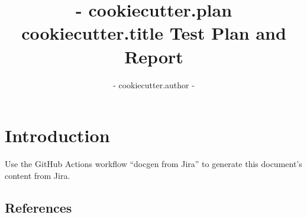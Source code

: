 \documentclass[DM,lsstdraft,toc]{lsstdoc}
\begin{document}
\def\milestoneName{ {{- cookiecutter.title -}} }
\def\milestoneId{ {{- cookiecutter.plan -}} }
\def\product{Data Management}


\title{ {{- cookiecutter.plan }} {{ cookiecutter.title }} Test Plan and Report}
\setDocRef{\lsstDocType-\lsstDocNum}
\date{\vcsDate}
\author{ {{- cookiecutter.author -}} }




\maketitle

\section{Introduction}
Use the GitHub Actions workflow ``docgen from Jira'' to generate this document's content from Jira.

\subsection{References}
\label{sect:references}
\renewcommand{\refname}{}




\end{document}
